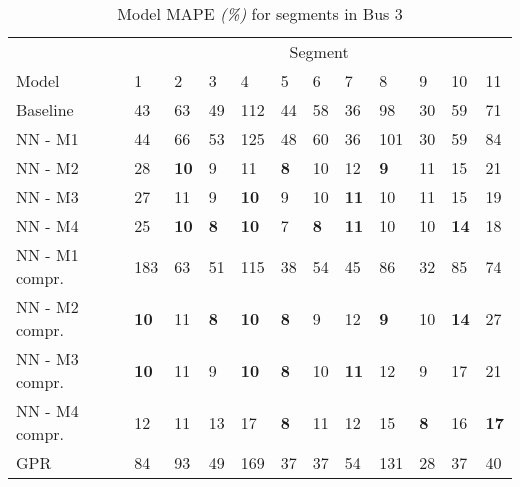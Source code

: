 \begin{table}[H]
  \centering
  \caption{Model MAPE \textit{(\%)} for segments in Bus 3}
  \label{fig:model-mape-of-segs-203}
  \begin{adjustbox}{center}

    \begin{tabular}{l|l|l|l|l|l|l|l|l|l|l|l}
      & \multicolumn{11}{c}{Segment}                                                                                                                                                      \\
		Model          & 1             & 2             & 3             & 4             & 5             & 6            & 7              & 8             & 9             & 10             & 11               \\ 
		\hline
		Baseline       & 43          & 63          & 49          & 112         & 44          & 58         & 36           & 98          & 30          & 59           & 71             \\
		NN - M1        & 44         & 66         & 53         & 125        & 48         & 60        & 36          & 101        & 30         & 59          & 84            \\
		NN - M2        & 28         & \textbf{10}         & 9          & 11         & \textbf{8}          & 10        & 12          & \textbf{9} & 11          & 15          & 21            \\
		NN - M3        & 27         & 11         & 9         & \textbf{10}         & 9          & 10         & \textbf{11}          & 10          & 11         & 15          & 19            \\
		NN - M4        & 25         & \textbf{10} & \textbf{8} & \textbf{10}          & 7          & \textbf{8} & \textbf{11}          & 10          & 10         & \textbf{14}          & 18            \\
		NN - M1 compr. & 183        & 63         & 51         & 115        & 38         & 54        & 45          & 86         & 32         & 85           & 74            \\
		NN - M2 compr. & \textbf{10}          & 11         & \textbf{8}          & \textbf{10} & \textbf{8} & 9         & 12          & \textbf{9}          & 10          & \textbf{14} & 27            \\
		NN - M3 compr. & \textbf{10} & 11         & 9          & \textbf{10}          & \textbf{8}          & 10         & \textbf{11} & 12        & 9          & 17           & 21            \\
		NN - M4 compr. & 12         & 11         & 13         & 17         & \textbf{8}          & 11         & 12          & 15         & \textbf{8} & 16           & \textbf{17}  \\
	GPR         & 84 & 93 & 49 & 169 & 37 & 37 &  54 & 131 & 28 &37 & 40 \\
		\end{tabular}
\end{adjustbox}
\end{table}

